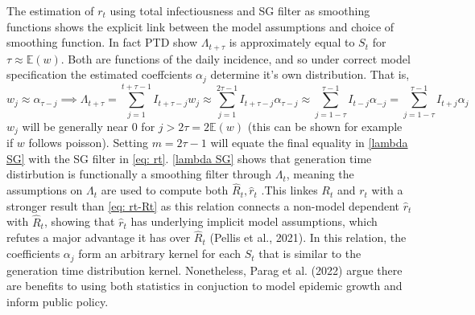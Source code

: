 \documentclass[12pt]{article}
\begin{document}
      The estimation of $r_t$ using total infectiousness and SG filter as smoothing functions shows the explicit link between
      the model assumptions and choice of smoothing function. In fact PTD show $\Lambda_{t+\tau}$ is approximately equal to $S_t$ 
      for $\tau \approx \mathbb{E}(w)$. Both are functions of the daily incidence, and so under correct model specification the
      estimated coeffcients $\alpha_j$ determine it's own distribution. That is,
      \begin{equation} \label{lambda SG}
        w_j \approx \alpha_{\tau - j} \implies 
        \Lambda_{t+\tau} = \sum_{j = 1}^{t + \tau - 1} I_{t + \tau - j}w_j  
        \approx \sum_{j = 1}^{2\tau - 1} I_{t + \tau - j}\alpha_{\tau -j}
        \approx \sum_{j = 1 - \tau}^{\tau - 1} I_{t - j} \alpha_{-j}
        = \sum_{j = 1 - \tau}^{\tau - 1} I_{t + j} \alpha_{j}
      \end{equation}
      $w_j$ will be generally near 0 for $j > 2\tau = 2\mathbb{E}(w)$ (this can be shown for example if $w$ follows poisson). 
      Setting $m = 2\tau - 1$ will equate the final equality in \cref{lambda SG} with the SG filter in \cref{eq: rt}.
      \cref{lambda SG} shows that generation time distirbution is functionally a smoothing filter through $\Lambda_t$, meaning
      the assumptions on $\Lambda_t$ are used to compute both $\hat{R}_t, \hat{r}_t$ .This linkes
      $R_t$ and $r_t$ with a stronger result than \cref{eq: rt-Rt} as this relation connects a non-model dependent $\hat{r}_t$ with $\hat{R}_t$, 
      showing that $\hat{r}_t$ has underlying implicit model assumptions, 
      which refutes a major advantage it has over $\hat{R}_t$ (Pellis et al., 2021). 
      In this relation, the coefficients $\alpha_j$ form an arbitrary kernel for each $S_t$ that is similar to the generation time
      distribution kernel. 
      Nonetheless, Parag et al. (2022) argue there are benefits to using both statistics in conjuction to 
      model epidemic growth and inform public policy. \\
\end{document}
